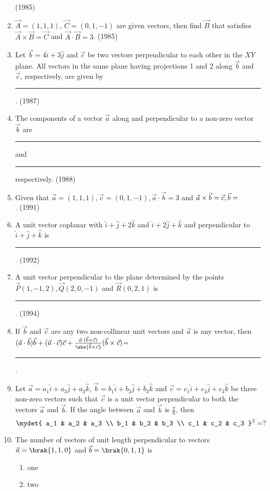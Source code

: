 \begin{enumerate}[label=\thesubsection.\arabic*.,ref=\thesubsection.\theenumi]
\hfill (1985)
\item $\vec{A}=(1,1,1)$, $\vec{C}=(0,1,-1)$ are given vectors, then find $\vec{B}$ that satisfies $\vec{A}\times\vec{B}=\vec{C}$ and $\vec{A}\cdot\vec{B}=3$. 
	\hfill (1985)
\item Let $\vec{b}=4\hat{i}+3\hat{j}$ and $\vec{c}$ be two vectors perpendicular to each other in the $XY$ plane. All vectors in the same plane having projections 1 and 2 along $\vec{b}$ and $\vec{c}$, respectively, are given by \rule{1cm}{0.01pt}.
\hfill (1987)
\item The components of a vector $\vec{a}$ along and  perpendicular to a non-zero vector $\vec{b}$ are \rule{1cm}{0.01pt} and \rule{1cm}{0.01pt} respectively.
\hfill (1988)
\item Given that $\vec{a}=(1,1,1),\vec{c}=(0,1,-1),\vec{a}\cdot\vec{b}=3$ and $\vec{a}\times\vec{b}=\vec{c}, \vec{b}= \rule{1cm}{0.01pt}$.
\hfill(1991)
\item A unit vector coplanar with $\hat{i}+\hat{j}+2\hat{k}$ and $\hat{i}+2\hat{j}+\hat{k}$ and perpendicular to $\hat{i}+\hat{j}+\hat{k}$ is \rule{1cm}{0.01pt}.
\hfill (1992)
\item A unit vector perpendicular to the plane determined by the points $\vec{P}(1,-1,2), \vec{Q}(2,0,-1)$ and $\vec{R}(0,2,1)$ is \rule{1cm}{0.01pt}.
\hfill (1994)
\item If $\vec{b}$ and $\vec{c}$ are any two non-collinear unit vectors and $\vec{a}$ is any vector, then $(\vec{a}\cdot\vec{b})\vec{b}+(\vec{a}\cdot\vec{c})\vec{c}+\frac{\vec{a}\cdot(\vec{b}\times\vec{c})}{\abs{\vec{b}\times\vec{c}}}(\vec{b}\times\vec{c})$=\rule{1cm}{0.01pt}.
\item %
		Let $\vec{a}=a_1\hat{i}+a_2\hat{j}+a_3\hat{k}$, $\vec{b}=b_1\hat{i}+b_2\hat{j}+b_3\hat{k}$ and $\vec{c}=c_1\hat{i}+c_2\hat{j}+c_3\hat{k}$ be three non-zero vectors such that $\vec{c}$ is a unit vector perpendicular to both the vectors $\vec{a}$ and $\vec{b}$. If the angle between $\vec{a}$ and $\vec{b}$ is $\frac{\pi}{6}$, then 
$$
	\mydet{
a_1 & a_2 & a_3 \\
b_1 & b_2 & b_3 \\
c_1 & c_2 & c_3
}^2
=?
$$
\hfill {}
\item %
	The number of vectors of unit length perpendicular to vectors $\vec{a}=\brak{1,1,0}$ and $\vec{b}=\brak{0,1,1}$ is \hfill {}
  \begin{multicols}{4}
		\begin{enumerate}
			\item one
		        \item two

\end{enumerate}
\end{multicols}
\end{enumerate}
